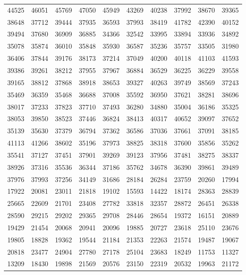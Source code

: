 \documentclass[reqno, 11pt]{amsart}
\theoremstyle{remark}
\begin{document}
\begin{longtable}{llllllllll}
44525 & 46051 & 45769 & 47050 & 45949 & 43269 & 40238 & 37992 & 38670 & 39365 \\
38648 & 37712 & 39444 & 37935 & 36593 & 37993 & 38419 & 41782 & 42390 & 40152 \\
39494 & 37680 & 36909 & 36885 & 34366 & 32542 & 33995 & 33894 & 33936 & 34892 \\
35078 & 35874 & 36010 & 35848 & 35930 & 36587 & 35236 & 35757 & 33505 & 31980 \\
36406 & 37844 & 39176 & 38173 & 37214 & 37049 & 40200 & 40118 & 41103 & 41593 \\
39386 & 39261 & 38212 & 37955 & 37967 & 36884 & 36529 & 36225 & 36229 & 39558 \\
39165 & 38812 & 37868 & 38918 & 38653 & 39327 & 40263 & 39749 & 38569 & 37243 \\
35469 & 36359 & 35468 & 36688 & 37008 & 35592 & 36950 & 37621 & 38281 & 38696 \\
38017 & 37233 & 37823 & 37710 & 37493 & 36280 & 34880 & 35004 & 36186 & 35325 \\
38053 & 39850 & 38523 & 37446 & 36824 & 38413 & 40317 & 40652 & 39097 & 37652 \\
35139 & 35630 & 37379 & 36794 & 37362 & 36586 & 37036 & 37661 & 37091 & 38185 \\
41113 & 41266 & 38602 & 35196 & 37973 & 38825 & 38318 & 37600 & 35856 & 35262 \\
35541 & 37127 & 37451 & 37901 & 39269 & 39123 & 37956 & 37481 & 38275 & 38337 \\
38926 & 37316 & 35536 & 36344 & 37186 & 35762 & 34678 & 36390 & 39861 & 39489 \\
37976 & 37993 & 37256 & 34149 & 31686 & 28184 & 26284 & 23759 & 20260 & 17994 \\
17922 & 20081 & 23011 & 21818 & 19102 & 15593 & 14422 & 18174 & 28363 & 28839 \\
25665 & 22609 & 21701 & 23408 & 27782 & 33818 & 32357 & 28872 & 26451 & 26338 \\
28590 & 29215 & 29202 & 29365 & 29708 & 28446 & 28654 & 19372 & 16151 & 20889 \\
19429 & 21454 & 20068 & 20941 & 20096 & 19885 & 20727 & 23618 & 25110 & 23676 \\
19805 & 18828 & 19362 & 19544 & 21184 & 21353 & 22263 & 21574 & 19487 & 19067 \\
20818 & 23477 & 24904 & 27780 & 27178 & 25104 & 23683 & 18249 & 11753 & 11327 \\
13209 & 18430 & 19898 & 21569 & 20576 & 23150 & 22319 & 20532 & 19963 & 21172 \\

\end{longtable}
\end{document}
